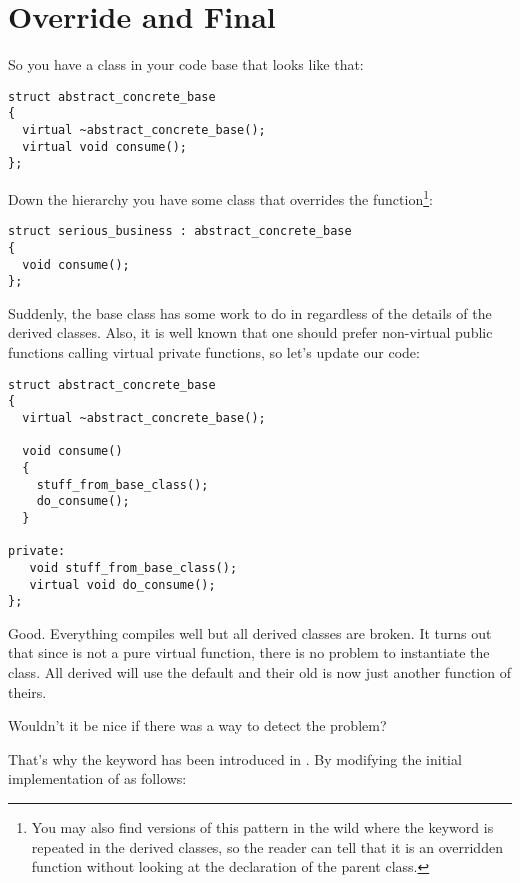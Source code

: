 \section{Override and Final}

So you have a class in your  code base that looks like that:

\begin{lstlisting}
struct abstract_concrete_base
{
  virtual ~abstract_concrete_base();
  virtual void consume();
};
\end{lstlisting}

Down the hierarchy you have some class that overrides the
 function\footnote{You may also find versions of this
  pattern in the wild where the  keyword is repeated in
  the derived classes, so the reader can tell that it is an overridden
  function without looking at the declaration of the parent class.}:

\begin{lstlisting}
struct serious_business : abstract_concrete_base
{
  void consume();
};
\end{lstlisting}

Suddenly, the base class has some work to do in 
regardless of the details of the derived classes. Also, it is well
known that one should prefer non-virtual public functions calling
virtual private functions, so let's update our code:

\begin{lstlisting}
struct abstract_concrete_base
{
  virtual ~abstract_concrete_base();

  void consume()
  {
    stuff_from_base_class();
    do_consume();
  }

private:
   void stuff_from_base_class();
   virtual void do_consume();
};
\end{lstlisting}

Good. Everything compiles well but all derived classes are broken. It
turns out that since  is not a pure virtual
function, there is no problem to instantiate the class. All derived
will use the default  and their old
 is now just another function of theirs.

Wouldn't it be nice if there was a way to detect the problem?

\medskip

That's why the  keyword has been introduced in
. By modifying the initial implementation of
 as follows:

